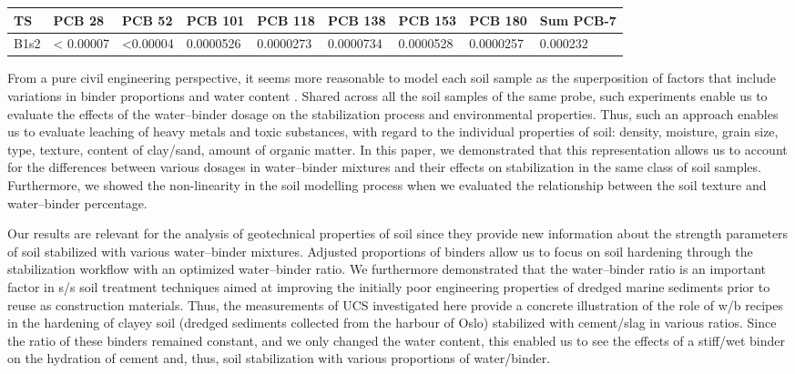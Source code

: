 \documentclass[sustainability,article,accept,pdftex,moreauthors]{Definitions/mdpi}
\begin{document}
{{\begin{table}[H]
\begin{tabularx}{\textwidth}{m{0.5cm}<{\centering}m{1.1cm}<{\centering}m{1.1cm}<{\centering}m{1.1cm}<{\centering}m{1.1cm}<{\centering}m{1.3cm}<{\centering}m{1.3cm}<{\centering}m{1.3cm}<{\centering}m{1.3cm}<{\centering}}
\toprule
\textbf{TS} & \textbf{PCB 28} & \textbf{PCB 52} & \textbf{PCB 101} & \textbf{PCB 118} & \textbf{PCB 138} & \textbf{PCB 153} & \textbf{PCB 180} & \textbf{Sum PCB-7} \\
\midrule
B1s2 & < 0.00007 %
 & <0.00004 & 0.0000526 & 0.0000273 & 0.0000734 & 0.0000528 & 0.0000257 & 0.000232 \\
\bottomrule
\end{tabularx}
\end{table}
 
From a pure civil engineering perspective, it seems more reasonable to model each soil sample as the superposition of factors that include variations in binder proportions and water content \cite{Bumanis,HAN2022e01660,HAY2023131529}. Shared across all {the soil }samples of the same{ }probe, such experiments enable us to evaluate the effects of {the }water--binder dosage on the stabilization process and environmental properties{. Thus, such an approach enables us to evaluate }leaching of heavy metals and toxic substances{, }with regard to the individual properties of soil: density, moisture, grain size, type, texture, content of clay/sand, amount of organic matter. In this paper, we demonstrated that this representation allows us to account for the differences between {various }dosages in water--binder mixtures and their effects on stabilization in the same class of soil samples. Furthermore, we showed the non-linearity in the soil modelling process when we evaluated the relationship between {the }soil texture and water--binder percentage. 

Our results are relevant for {the }analysis of geotechnical properties of soil since they provide new information about the strength parameters of soil stabilized with various water--binder mixtures. Adjusted proportions of binders allow us to focus on soil hardening through the stabilization workflow with an optimized water--binder ratio. We {furthermore }demonstrated {that} the water--binder ratio is {an }important factor in s/s {soil }treatment techniques aimed at improving {the initially }poor engineering properties of dredged marine sediments prior to reuse {as construction materials}. {Thus, the measurements of UCS investigated here provide a concrete illustration of the role of w/b recipes in the hardening of clayey soil (dredged sediments collected from the harbour of Oslo) stabilized with cement/slag in various ratios. Since the ratio of these binders remained constant, and we only changed the water content, this enabled us to see the effects of a stiff/wet binder on the hydration of cement and, thus, soil stabilization with various proportions of water/binder.} %

}}
\end{document}
